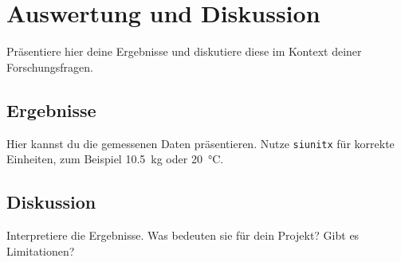 
\chapter{Auswertung und Diskussion}
\label{ch:auswertung}

Präsentiere hier deine Ergebnisse und diskutiere diese im Kontext deiner Forschungsfragen.

\section{Ergebnisse}
Hier kannst du die gemessenen Daten präsentieren. Nutze \texttt{siunitx} für korrekte Einheiten, zum Beispiel \SI{10.5}{\kilo\gram} oder \SI{20}{\degreeCelsius}.

\section{Diskussion}
Interpretiere die Ergebnisse. Was bedeuten sie für dein Projekt? Gibt es Limitationen?

